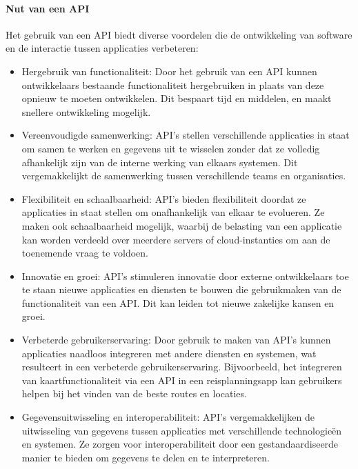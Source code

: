 \paragraph{Nut van een API}
Het gebruik van een API biedt diverse voordelen die de ontwikkeling van software en de interactie tussen applicaties verbeteren:
\begin{itemize}
    \item Hergebruik van functionaliteit: Door het gebruik van een API kunnen ontwikkelaars bestaande functionaliteit hergebruiken in plaats van deze opnieuw te moeten ontwikkelen. Dit bespaart tijd en middelen, en maakt snellere ontwikkeling mogelijk.
    \item Vereenvoudigde samenwerking: API's stellen verschillende applicaties in staat om samen te werken en gegevens uit te wisselen zonder dat ze volledig afhankelijk zijn van de interne werking van elkaars systemen. Dit vergemakkelijkt de samenwerking tussen verschillende teams en organisaties.
    \item Flexibiliteit en schaalbaarheid: API's bieden flexibiliteit doordat ze applicaties in staat stellen om onafhankelijk van elkaar te evolueren. Ze maken ook schaalbaarheid mogelijk, waarbij de belasting van een applicatie kan worden verdeeld over meerdere servers of cloud-instanties om aan de toenemende vraag te voldoen.
    \item Innovatie en groei: API's stimuleren innovatie door externe ontwikkelaars toe te staan nieuwe applicaties en diensten te bouwen die gebruikmaken van de functionaliteit van een API. Dit kan leiden tot nieuwe zakelijke kansen en groei.
    \item Verbeterde gebruikerservaring: Door gebruik te maken van API's kunnen applicaties naadloos integreren met andere diensten en systemen, wat resulteert in een verbeterde gebruikerservaring. Bijvoorbeeld, het integreren van kaartfunctionaliteit via een API in een reisplanningsapp kan gebruikers helpen bij het vinden van de beste routes en locaties.
    \item Gegevensuitwisseling en interoperabiliteit: API's vergemakkelijken de uitwisseling van gegevens tussen applicaties met verschillende technologieën en systemen. Ze zorgen voor interoperabiliteit door een gestandaardiseerde manier te bieden om gegevens te delen en te interpreteren.
\end{itemize} \autocite{Wouter}
